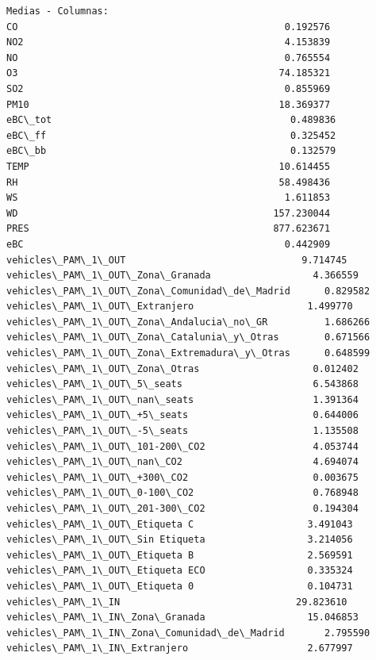 \documentclass[11pt]{article}
\begin{document}
    \begin{Verbatim}[commandchars=\\\{\}]
Medias - Columnas:
CO                                               0.192576
NO2                                              4.153839
NO                                               0.765554
O3                                              74.185321
SO2                                              0.855969
PM10                                            18.369377
eBC\_tot                                          0.489836
eBC\_ff                                           0.325452
eBC\_bb                                           0.132579
TEMP                                            10.614455
RH                                              58.498436
WS                                               1.611853
WD                                             157.230044
PRES                                           877.623671
eBC                                              0.442909
vehicles\_PAM\_1\_OUT                               9.714745
vehicles\_PAM\_1\_OUT\_Zona\_Granada                  4.366559
vehicles\_PAM\_1\_OUT\_Zona\_Comunidad\_de\_Madrid      0.829582
vehicles\_PAM\_1\_OUT\_Extranjero                    1.499770
vehicles\_PAM\_1\_OUT\_Zona\_Andalucia\_no\_GR          1.686266
vehicles\_PAM\_1\_OUT\_Zona\_Catalunia\_y\_Otras        0.671566
vehicles\_PAM\_1\_OUT\_Zona\_Extremadura\_y\_Otras      0.648599
vehicles\_PAM\_1\_OUT\_Zona\_Otras                    0.012402
vehicles\_PAM\_1\_OUT\_5\_seats                       6.543868
vehicles\_PAM\_1\_OUT\_nan\_seats                     1.391364
vehicles\_PAM\_1\_OUT\_+5\_seats                      0.644006
vehicles\_PAM\_1\_OUT\_-5\_seats                      1.135508
vehicles\_PAM\_1\_OUT\_101-200\_CO2                   4.053744
vehicles\_PAM\_1\_OUT\_nan\_CO2                       4.694074
vehicles\_PAM\_1\_OUT\_+300\_CO2                      0.003675
vehicles\_PAM\_1\_OUT\_0-100\_CO2                     0.768948
vehicles\_PAM\_1\_OUT\_201-300\_CO2                   0.194304
vehicles\_PAM\_1\_OUT\_Etiqueta C                    3.491043
vehicles\_PAM\_1\_OUT\_Sin Etiqueta                  3.214056
vehicles\_PAM\_1\_OUT\_Etiqueta B                    2.569591
vehicles\_PAM\_1\_OUT\_Etiqueta ECO                  0.335324
vehicles\_PAM\_1\_OUT\_Etiqueta 0                    0.104731
vehicles\_PAM\_1\_IN                               29.823610
vehicles\_PAM\_1\_IN\_Zona\_Granada                  15.046853
vehicles\_PAM\_1\_IN\_Zona\_Comunidad\_de\_Madrid       2.795590
vehicles\_PAM\_1\_IN\_Extranjero                     2.677997

\end{Verbatim}
\end{document}
